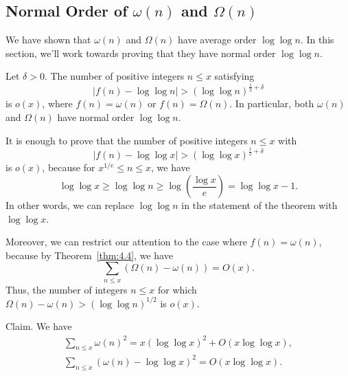 \subsection{Normal Order of $\omega(n)$ and $\Omega(n)$}\label{subsec:4.4}
We have shown that $\omega(n)$ and $\Omega(n)$ have average order $\log\log n$. 
In this section, we'll work towards proving that they have normal order $\log\log n$. 

\begin{thm}\label{thm:4.10}
    Let $\delta > 0$. The number of positive integers $n \leq x$ satisfying 
    \[ |f(n) - \log\log n| > (\log\log n)^{\frac12+\delta} \] 
    is $o(x)$, where $f(n) = \omega(n)$ or $f(n) = \Omega(n)$. In particular, 
    both $\omega(n)$ and $\Omega(n)$ have normal order $\log\log n$. 
\end{thm}
\begin{pf}
    It is enough to prove that the number of positive integers $n \leq x$ with 
    \[ |f(n) - \log\log x| > (\log\log x)^{\frac12+\delta} \] 
    is $o(x)$, because for $x^{1/e} \leq n \leq x$, we have 
    \[ \log\log x \geq \log\log n \geq \log\left(\frac{\log x}e\right) = 
    \log\log x - 1. \] 
    In other words, we can replace $\log\log n$ in the statement of the theorem 
    with $\log\log x$. 

    Moreover, we can restrict our attention to the case where $f(n) = \omega(n)$, 
    because by Theorem~\ref{thm:4.4}, we have 
    \[ \sum_{n\leq x} (\Omega(n) - \omega(n)) = O(x). \] 
    Thus, the number of integers $n \leq x$ for which $\Omega(n) - \omega(n) 
    > (\log\log n)^{1/2}$ is $o(x)$. 

    {\sc Claim.} We have 
    \begin{align*}
        \sum_{n\leq x} \omega(n)^2 = x(\log\log x)^2 + O(x\log\log x), \\ 
        \sum_{n\leq x} (\omega(n) - \log\log x)^2 = O(x\log\log x). 
    \end{align*}


\end{pf}
